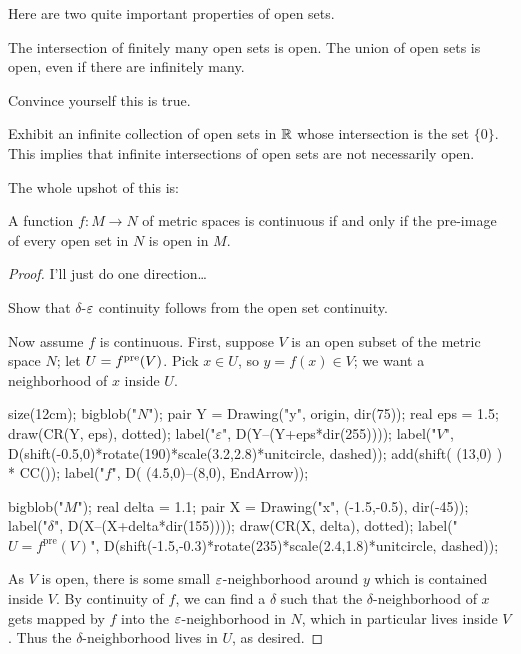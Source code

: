 Here are two quite important properties of open sets.
\begin{proposition}
	\listhack
	\begin{enumerate}[(a)]
		\ii The intersection of finitely many open sets is open.
		\ii The union of open sets is open, even if there are infinitely many.
	\end{enumerate}
\end{proposition}
\begin{ques}
	Convince yourself this is true.
\end{ques}
\begin{exercise}
	Exhibit an infinite collection of open sets in $\mathbb R$
	whose intersection is the set $\{0\}$.
	This implies that infinite intersections of open sets are not necessarily open.
\end{exercise}

The whole upshot of this is:
\begin{theorem}
	A function $f : M \to N$ of metric spaces is continuous
	if and only if the pre-image of every open set in $N$ is open in $M$.
\end{theorem}
\begin{proof}
	I'll just do one direction\dots
	\begin{exercise}
		Show that $\delta$-$\varepsilon$ continuity follows from
		the open set continuity.
	\end{exercise}
	Now assume $f$ is continuous.
	First, suppose $V$ is an open subset of the metric space $N$;
	let $U = f^{\text{pre}}(V)$. Pick $x \in U$, so $y = f(x) \in V$; we want a neighborhood of $x$ inside $U$.

	\begin{center}
		\begin{asy}
			size(12cm);
			bigblob("$N$");
			pair Y = Drawing("y", origin, dir(75));
			real eps = 1.5;
			draw(CR(Y, eps), dotted);
			label("$\varepsilon$", D(Y--(Y+eps*dir(255))));
			label("$V$",
				D(shift(-0.5,0)*rotate(190)*scale(3.2,2.8)*unitcircle, dashed));
			add(shift( (13,0) ) * CC());
			label("$f$", D( (4.5,0)--(8,0), EndArrow));

			bigblob("$M$");
			real delta = 1.1;
			pair X = Drawing("x", (-1.5,-0.5), dir(-45));
			label("$\delta$", D(X--(X+delta*dir(155))));
			draw(CR(X, delta), dotted);
			label("$U = f^{\text{pre}}(V)$",
				D(shift(-1.5,-0.3)*rotate(235)*scale(2.4,1.8)*unitcircle, dashed));
		\end{asy}
	\end{center}

	As $V$ is open, there is some small $\varepsilon$-neighborhood around $y$
	which is contained inside $V$.
	By continuity of $f$, we can find a $\delta$ such that the $\delta$-neighborhood
	of $x$ gets mapped by $f$ into the $\varepsilon$-neighborhood in $N$,
	which in particular lives inside $V$.
	Thus the $\delta$-neighborhood lives in $U$, as desired.
\end{proof}

